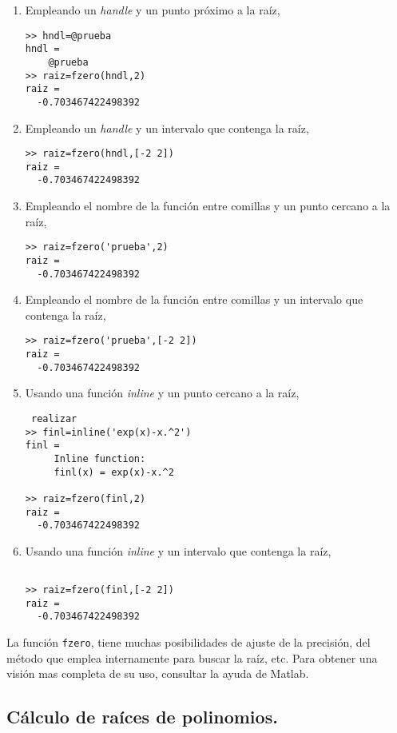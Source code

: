 \begin{enumerate}
\item Empleando un \emph{handle} y un punto próximo a la raíz,
\begin{verbatim}
>> hndl=@prueba
hndl = 
    @prueba
>> raiz=fzero(hndl,2)
raiz =
  -0.703467422498392
\end{verbatim}
\item Empleando un \emph{handle} y un intervalo que contenga la raíz,
\begin{verbatim}
>> raiz=fzero(hndl,[-2 2])
raiz =
  -0.703467422498392
\end{verbatim}

\item Empleando el nombre de la función entre comillas y un punto cercano a la raíz,
\begin{verbatim}
>> raiz=fzero('prueba',2)
raiz =
  -0.703467422498392
\end{verbatim}

\item  Empleando el nombre de la función entre comillas y un intervalo que contenga la raíz,
\begin{verbatim}
>> raiz=fzero('prueba',[-2 2])
raiz =
  -0.703467422498392
\end{verbatim}

\item Usando una función \emph{inline} y un punto cercano a la raíz,
\begin{verbatim} realizar 
>> finl=inline('exp(x)-x.^2')
finl =
     Inline function:
     finl(x) = exp(x)-x.^2

>> raiz=fzero(finl,2)
raiz =
  -0.703467422498392
\end{verbatim}

\item Usando una función \emph{inline} y un intervalo que contenga la raíz, 
\begin{verbatim}

>> raiz=fzero(finl,[-2 2])
raiz =
  -0.703467422498392
\end{verbatim}
\end{enumerate} 

La función \texttt{fzero}, tiene muchas posibilidades de ajuste de la precisión, del método que emplea internamente para buscar la raíz, etc. Para obtener una visión mas completa de su uso, consultar la ayuda de Matlab.

\subsection{Cálculo de raíces de polinomios.} 

